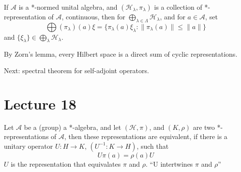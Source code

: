 If $\mathcal{A}$ is a *-normed unital algebra, and $(\mathcal{H}_\lambda, \pi_\lambda)$ is a collection of *-representation of $\mathcal{A}$, continuous, then for $\bigoplus_{\lambda\in\Lambda}\mathcal{H}_\lambda$, and for $a\in\mathcal{A}$, set
\begin{equation*}
    \bigoplus(\pi_\lambda)(a)\xi=\{\pi_\lambda(a)\xi_\lambda: \|\pi_\lambda(a)\|\leq\|a\|\}
\end{equation*}
and $\{\xi_\lambda\}\in\bigoplus_\lambda \mathcal{H}_\lambda$.

By Zorn's lemma, every Hilbert space is a direct sum of cyclic representations.

Next: spectral theorem for self-adjoint operators.

\section{Lecture 18}
\begin{definition}
    Let $\mathcal{A}$ be a (group) a *-algebra, and let $(\mathcal{H}, \pi)$, and $(K, \rho)$ are two *-representations of $\mathcal{A}$, then these representations are equivalent, if there is a unitary operator $U: H\to K$, $(U^{-1}: K\to H)$, such that
    \begin{equation*}
        U\pi(a)=\rho(a)U
    \end{equation*}
    $U$ is the representation that equivalates $\pi$ and $\rho$. ``U intertwines $\pi$ and $\rho$''
\end{definition}

